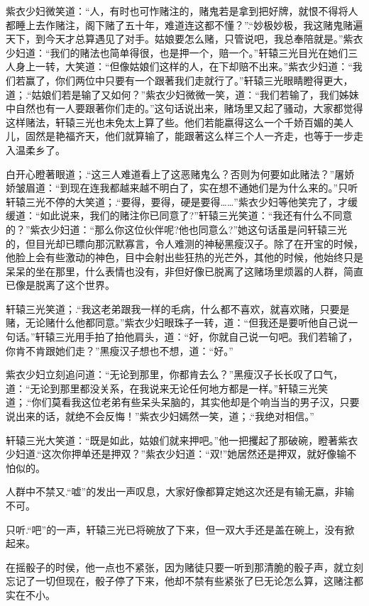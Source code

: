 \documentclass[12pt,oneside]{book}
\begin{document}
紫衣少妇微笑道：``人，有时也可怍赌注的，赌鬼若是拿到把好牌，就恨不得将人都睡上去作赌注，阁下赌了五十年，难道连这都不懂？''.``妙极妙极，我这赌鬼赌遍天下，到今天才总算遇见了对手。姑娘要怎么赌，只管说吧，我总奉陪就是。''紫衣少妇道：``我们的赌法也简单得很，也是押一个，赔一个。''轩辕三光目光在她们三人身上一转，大笑道：``但像姑娘们这样的人，在下却赔不出来。''紫衣少妇道：``我们若赢了，你们两位中只要有一个跟著我们走就行了。''轩辕三光眼睛瞪得更大，道；.``姑娘们若是输了又如何？''紫衣少妇微微一笑，道：``我们若输了，我们姊妹中自然也有一人要跟著你们走的。''这句话说出来，赌场里又起了骚动，大家都觉得这样赌法，轩辕三光也未免太上算了些。他们若能嬴得这么一个千娇百媚的美人儿，固然是艳福齐天，他们就算输了，能跟著这么样三个人一齐走，也等于一步走入温柔乡了。

白开心瞪著眼道；.``这三人难道看上了这恶赌鬼么？否则为何要如此赌法？''屠娇娇皱眉道：``到现在连我都越来越不明白了，实在想不通她们是为什么来的。''只听轩辕三光不停的大笑道；.``要得，要得，硬是要得\ldots\ldots{}''紫衣少妇等他笑完了，才缓缓道：``如此说来，我们的赌注你已同意了?''轩辕三光笑道：``我还有什么不同意的？''紫衣少妇道：``那么你这位伙伴呢?他也同意么?''她这句话虽是问轩辕三光的，但目光却已瞟向那沉默寡言，令人难测的神秘黑瘦汉子。除了在开宝的时候，他脸上会有些激动的神色，目中会射出些狂热的光芒外，其他的时候，他始终只是呆呆的坐在那里，什么表情也没有，非但好像已脱离了这赌场里烦嚣的人群，简直已像是脱离了这个世界。

轩辕三光笑道；.``我这老弟跟我一样的毛病，什么都不喜欢，就喜欢赌，只要是赌，无论赌什么他都同意。''紫衣少妇眼珠子一转，道：``但我还是要听他自己说一句话。''轩辕三光用手拍了拍他肩头，道：``好，你就自己说一句吧。我们若输了，你肯不肯跟她们走？''黑瘦汉子想也不想，道：``好。''

紫衣少妇立刻追问道：``无论到那里，你都肯去么？''黑瘦汉子长长叹了口气，道：``无论到那里都没关系，在我说来无论任何地方都是一样。''轩辕三光笑道；.``你们莫看我这位老弟有些呆头呆脑的，其实他却是个响当当的男子汉，只要说出来的话，就绝不会反悔！''紫衣少妇嫣然一笑，道；.``我绝对相信。''

轩辕三光大笑道：``既是如此，姑娘们就来押吧。''他一把攫起了那破碗，瞪著紫衣少妇道.``这次你押单还是押双？''紫衣少妇道：``双!''她居然还是押双，就好像输不怕似的。

人群中不禁又.``嘘''的发出一声叹息，大家好像都算定她这次还是有输无嬴，非输不可。

只听.``吧''的一声，轩辕三光已将碗放了下来，但一双大手还是盖在碗上，没有掀起来。

在摇骰子的时侯，他一点也不紧张，因为赌徒只要一听到那清脆的骰子声，就立刻忘记了一切但现在，骰子停了下来，他却不禁有些紧张了巳无论怎么算，这赌注都实在不小。
\end{document}
